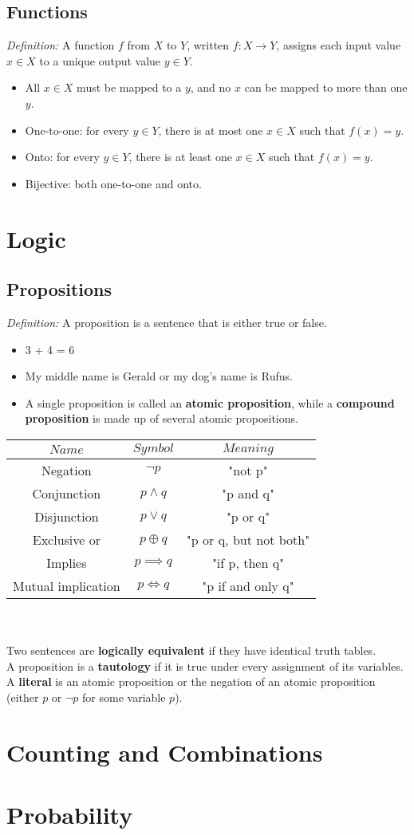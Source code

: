 \documentclass[titlepage]{article}
\begin{document}
\subsection{Functions}
\emph{Definition: }A function $f$ from $X$ to $Y$, written $f : X \rightarrow Y$, assigns each input value
$x \in X$ to a unique output value $y \in Y$.
\begin{itemize}
  \item All $x \in X$ must be mapped to a $y$, and no $x$ can be mapped to more than one $y$.
  \item One-to-one: for every $y \in Y$, there is at most one $x \in X$ such that $f(x) = y$.
  \item Onto: for every $y \in Y$, there is at least one $x \in X$ such that $f(x) = y$.
  \item Bijective: both one-to-one and onto.
\end{itemize}

\section{Logic}
\subsection{Propositions}
\emph{Definition: }A proposition is a sentence that is either true or false.
\begin{itemize}
  \item 3 + 4 = 6
  \item My middle name is Gerald or my dog's name is Rufus.
  \item A single proposition is called an \textbf{atomic proposition}, while a \textbf{compound proposition} is made up of several atomic propositions.\\
\end{itemize}
\begin{tabular}{c|c|c}
\textbf{$Name$} & \textbf{$Symbol$} & \textbf{$Meaning$} \\ \hline
Negation & $\lnot p$ & "not p" \\
Conjunction & $p \land q$ & "p and q" \\
Disjunction & $p \lor q$ & "p or q" \\
Exclusive or & $p \oplus q$ & "p or q, but not both" \\
Implies & $p \implies q$ & "if p, then q" \\
Mutual implication & $p \iff q$ & "p if and only q" \\
\end{tabular}
\\
\\Two sentences are \textbf{logically equivalent} if they have identical truth tables.  
\\A proposition is a \textbf{tautology} if it is true under every assignment of its variables. 
\\A \textbf{literal} is an atomic proposition or the negation of an atomic proposition (either $p$ or $\lnot p$ for some variable $p$).
\section{Counting and Combinations}

\section{Probability}
\end{document}
